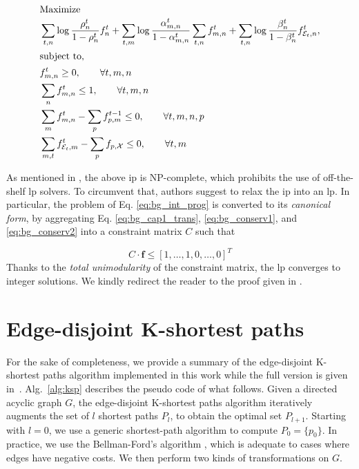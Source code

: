 \begin{subequations}
\label{eq:bg_int_prog}
\begin{align}
\intertext{Maximize}
&\sum_{t,n} \log{\frac{\rho_n^t}{1-\rho_n^t}}f_n^t + \sum_{t,m} \log{\frac{\alpha_{m,n}^{t}}{1-\alpha_{m,n}^{t}}}\sum_{t,n}f_{m,n}^{t} + \sum_{t,n} \log{\frac{\beta_n^t}{1-\beta_n^t}}f_{\mathcal{E}_t,n}^{t},\label{eq:bg_loglikelihood}\\
\intertext{subject to,}
&f_{m,n}^{t} \geq 0, \qquad \forall t,m,n \label{eq:nonneg_flow}\\
&\sum\limits_{n}f_{m,n}^{t} \leq 1, \qquad \forall t,m,n \label{eq:bg_cap1_trans}\\
&\sum_m f_{m,n}^{t} - \sum_p f^{t-1}_{p,m} \leq 0, \qquad \forall t,m,n,p \label{eq:bg_conserv1}\\
&\sum_{m,t} f^t_{\mathcal{E}_t,m} - \sum_p f_{p,\mathcal{X}} \leq 0, \qquad \forall t,m\label{eq:bg_conserv2}
\end{align}
\end{subequations}

As mentioned in \cite{berclaz11}, the above \gls{ip} is NP-complete, which prohibits the use of off-the-shelf \gls{lp} solvers.
To circumvent that, authors suggest to relax the \gls{ip} into an \gls{lp}.
In particular, the problem of Eq. \ref{eq:bg_int_prog} is converted to its \textit{canonical form}, by aggregating Eq. \ref{eq:bg_cap1_trans}, \ref{eq:bg_conserv1}, and \ref{eq:bg_conserv2} into a constraint matrix $C$ such that

\begin{equation}
  C \cdot \bm{f} \leq [1, \ldots, 1, 0, \ldots, 0]^{T}
\end{equation}
Thanks to the  \textit{total unimodularity} of the constraint matrix, the \gls{lp} converges to integer solutions.
We kindly redirect the reader to the proof given in \cite{berclaz11}.

\section{Edge-disjoint K-shortest paths}
\label{sec:ksp}

For the sake of completeness, we provide a summary of the edge-disjoint K-shortest paths algorithm implemented in this work while the full version is given in~\cite{suurballe74}.
Alg.~\ref{alg:ksp} describes the pseudo code of what follows.
Given a directed acyclic graph $G$, the edge-disjoint K-shortest paths algorithm iteratively augments the set of $l$ shortest paths $P_{l}$, to obtain the optimal set $P_{l+1}$. Starting with $l=0$, we use a generic shortest-path algorithm to compute $P_0=\{p_0\}$.
In practice, we use the Bellman-Ford's algorithm \cite{bellman58}, which is adequate to cases where edges have negative costs. We then perform two kinds of transformations on $G$.

